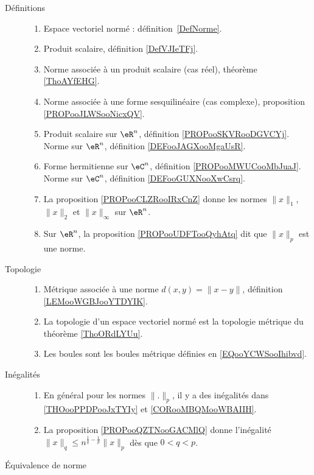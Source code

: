 
      \label{THEMEooUJVXooZdlmHj}

\begin{description}
	\item[Définitions]
	      \begin{enumerate}
		      \item
		            Espace vectoriel normé : définition~\ref{DefNorme}.
                \item
                    Produit scalaire, définition \ref{DefVJIeTFj}.
		      \item
		            Norme associée à un produit scalaire (cas réel), théorème \ref{ThoAYfEHG}.
		      \item
		            Norme associée à une forme sesquilinéaire (cas complexe), proposition \ref{PROPooJLWSooNicxQV}.
		      \item
		            Produit scalaire sur \( \eR^n\), définition \ref{PROPooSKVRooDGVCYj}. Norme sur \( \eR^n\), définition \ref{DEFooJAGXooMgaUsR}.
		      \item
		            Forme hermitienne sur \( \eC^n\), définition \ref{PROPooMWUCooMbJuaJ}. Norme sur \( \eC^n\), définition \ref{DEFooGUXNooXwCsrq}.
		      \item
		            La proposition \ref{PROPooCLZRooIRxCnZ} donne les normes \( \| x \|_1\), \( \| x \|_2\) et \( \| x \|_{\infty}\) sur \( \eR^n\).
		      \item
		            Sur \( \eR^n\), la proposition \ref{PROPooUDFTooQyhAtq} dit que \( \| x \|_p\) est une norme.
	      \end{enumerate}
	\item[Topologie]
	      \begin{enumerate}
		      \item
		            Métrique associée à une norme \( d(x,y)=\| x-y \|\), définition \ref{LEMooWGBJooYTDYIK}.
		      \item
		            La topologie d'un espace vectoriel normé est la topologie métrique du théorème \ref{ThoORdLYUu}.
		      \item
		            Les boules sont les boules métrique définies en \eqref{EQooYCWSooIhibvd}.
	      \end{enumerate}
	\item[Inégalités]
	      \begin{enumerate}
		      \item
		            En général pour les normes \( \| . \|_p\), il y a des inégalités dans \ref{THOooPPDPooJxTYIy} et \ref{CORooMBQMooWBAIIH}.
		      \item
		            La proposition \ref{PROPooQZTNooGACMlQ} donne l'inégalité \( \| x \|_q\leq n^{\frac{1}{ q }-\frac{1}{ p }}\| x \|_p\) dès que \( 0<q<p\).
	      \end{enumerate}
	\item[Équivalence de norme]


\end{description}
